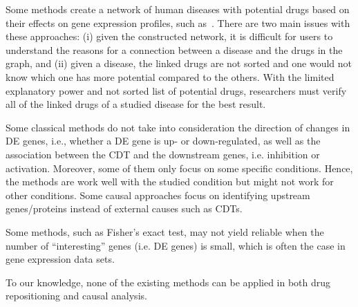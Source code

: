Some methods create a network of human diseases with potential drugs based on their effects on gene expression profiles, such as~\cite{hu2009human, iorio2010identification, iorio2010discovery}. There are two main issues with these approaches: (i) given the constructed network, it is difficult for users to understand the reasons for a connection between a disease and the drugs in the graph, and (ii) given a disease, the linked drugs are not sorted and one would not know which one has more potential compared to the others. With the limited explanatory power and not sorted list of potential drugs, researchers must verify all of the linked drugs of a studied disease for the best result. 

Some classical methods do not take into consideration the direction of changes in DE genes, i.e., whether a DE gene is up- or down-regulated, as well as the association between the CDT and the downstream genes, i.e. inhibition or activation.  
Moreover, some of them only focus on some specific conditions. Hence, the methods are work well with the studied condition but might not work for other conditions.
Some causal approaches focus  on identifying upstream genes/proteins instead of external causes such as CDTs. 

Some methods, such as Fisher's exact test, may not yield reliable when the number of ``interesting'' genes (i.e. DE genes) is small, which is often the case in gene expression data sets. 

To our knowledge, none of the existing methods can be applied in both drug repositioning and causal analysis. 





